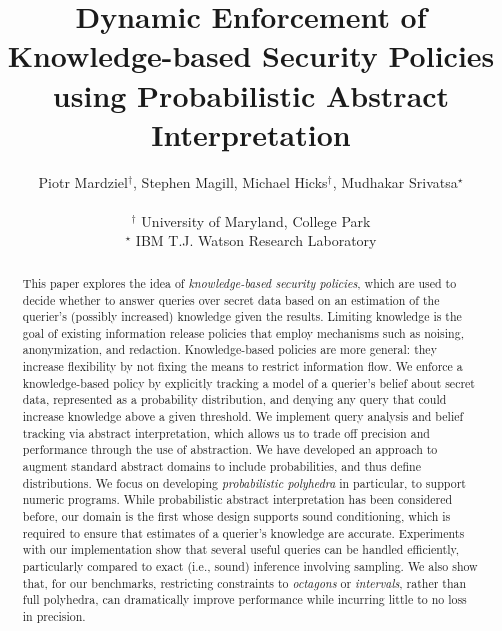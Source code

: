 \documentclass[9pt]{article}
\title{Dynamic Enforcement of Knowledge-based Security Policies using
  Probabilistic Abstract Interpretation}
\author{
Piotr Mardziel$^\dagger$, Stephen Magill, Michael Hicks$^\dagger$, Mudhakar
Srivatsa$^\star$\\\\
$^\dagger$ University of Maryland, College Park\\
$^\star$ IBM T.J. Watson Research Laboratory\\
}
\begin{document}
\pagestyle{plain}

\maketitle
\date{}


\begin{abstract}

  This paper explores the idea of \emph{knowledge-based security
    policies}, which are used to decide whether to answer queries over
    secret data based on an estimation of the querier's (possibly
    increased) knowledge given the results.  Limiting knowledge is the
    goal of existing information release policies that employ
    mechanisms such as noising, anonymization, and redaction.
    Knowledge-based policies are more general: they increase
    flexibility by not fixing the means to restrict information flow.
    We enforce a knowledge-based policy by explicitly tracking a model
    of a querier's belief about secret data, represented as a
    probability distribution, and denying any query that could
    increase knowledge above a given threshold.  We implement query
    analysis and belief tracking via abstract interpretation, which allows us to
    trade off precision and performance through the use of
    abstraction. We have developed an approach to augment standard
    abstract domains to include probabilities, and thus define
    distributions.  We focus on developing \emph{probabilistic
      polyhedra} in particular, to support numeric programs. While
    probabilistic abstract interpretation has been 
    considered before, our domain is the first whose design supports
    sound conditioning, which is required to ensure that estimates of
    a querier's knowledge are accurate. Experiments with our
    implementation show that several useful queries can be handled
    efficiently, particularly compared to exact (i.e., sound)
    inference involving sampling.  We also show that, for our
    benchmarks, restricting constraints to \emph{octagons}
    or \emph{intervals}, rather than full polyhedra, can dramatically
    improve performance while incurring little to no loss in
    precision.
\end{abstract}
\end{document}
